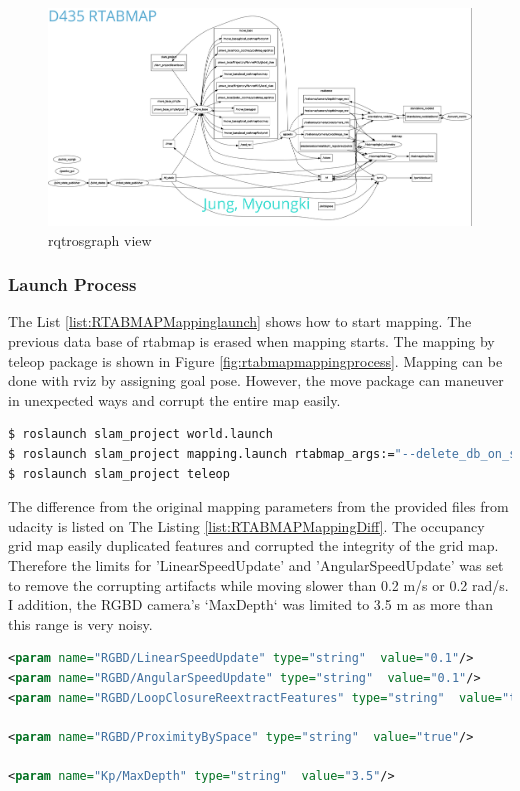 \documentclass[10pt,journal,compsoc]{IEEEtran}
\begin{document}
\begin{figure}[thpb]
      \centering
      \includegraphics[width=\columnwidth]{./img/rqtrosgraph.png}
      \caption{rqtrosgraph view}
      \label{fig:rqtrosgraph}
\end{figure}

\subsubsection{Launch Process}
The List \ref{list:RTABMAPMappinglaunch} shows how to start mapping. The previous data base of rtabmap is erased when mapping starts. The mapping by teleop package is shown in Figure \ref{fig:rtabmapmappingprocess}. Mapping can be done with rviz by assigning goal pose. However, the move package can maneuver in unexpected ways and corrupt the entire map easily.
\begin{lstlisting}[language=sh, caption={RTABMAP mapping launch command},label={list:RTABMAPMappinglaunch}]
$ roslaunch slam_project world.launch
$ roslaunch slam_project mapping.launch rtabmap_args:="--delete_db_on_start" rtabmapviz:=false rviz:=true
$ roslaunch slam_project teleop
\end{lstlisting}

The difference from the original mapping parameters from the provided files from udacity is listed on The Listing \ref{list:RTABMAPMappingDiff}. The occupancy grid map easily duplicated features and corrupted the integrity of the grid map. Therefore the limits for 'LinearSpeedUpdate' and 'AngularSpeedUpdate' was set to remove the corrupting artifacts while moving slower than 0.2 m/s or 0.2 rad/s. I addition, the RGBD camera's `MaxDepth` was limited to 3.5 m as more than this range is very noisy.
\begin{lstlisting}[language=XML, caption={Diff RTABMAP mapping.launch},label={list:RTABMAPMappingDiff}]
<param name="RGBD/LinearSpeedUpdate" type="string"  value="0.1"/>
<param name="RGBD/AngularSpeedUpdate" type="string"  value="0.1"/>
<param name="RGBD/LoopClosureReextractFeatures" type="string"  value="true"/>

<param name="RGBD/ProximityBySpace" type="string"  value="true"/>

<param name="Kp/MaxDepth" type="string"  value="3.5"/>  
\end{lstlisting}
\end{document}
